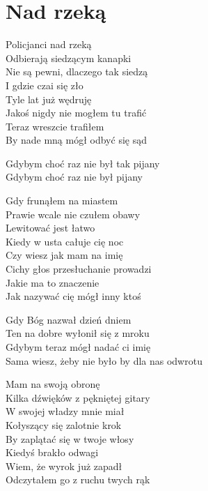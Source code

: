\section{Nad rzeką}
\begin{text}
Policjanci nad rzeką\\
Odbierają siedzącym kanapki\\
Nie są pewni, dlaczego tak siedzą\\
I gdzie czai się zło\\
Tyle lat już wędruję\\
Jakoś nigdy nie mogłem tu trafić\\
Teraz wreszcie trafiłem\\
By nade mną mógł odbyć się sąd

\vin Gdybym choć raz nie był tak pijany\\
\vin Gdybym choć raz nie był pijany

Gdy frunąłem na miastem\\
Prawie wcale nie czułem obawy\\
Lewitować jest łatwo\\
Kiedy w usta całuje cię noc\\
Czy wiesz jak mam na imię\\
Cichy głos przesłuchanie prowadzi\\
Jakie ma to znaczenie\\
Jak nazywać cię mógł inny ktoś

\vin Gdy Bóg nazwał dzień dniem\\
\vin Ten na dobre wyłonił się z mroku\\
\vin Gdybym teraz mógł nadać ci imię\\
\vin Sama wiesz, żeby nie było by dla nas odwrotu

Mam na swoją obronę\\
Kilka dźwięków z pękniętej gitary\\
W swojej władzy mnie miał\\
Kołyszący się zalotnie krok\\
By zaplątać się w twoje włosy\\
Kiedyś brakło odwagi\\
Wiem, że wyrok już zapadł\\
Odczytałem go z ruchu twych rąk
\end{text}

